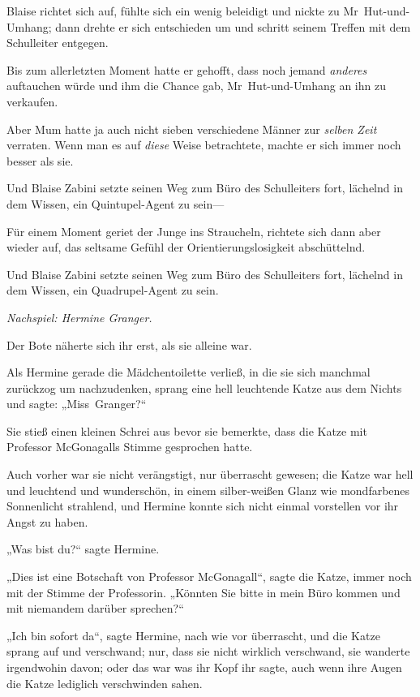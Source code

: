 {Blaise richtet sich auf, fühlte sich ein wenig beleidigt und nickte zu Mr~Hut-und-Umhang; dann drehte er sich entschieden um und schritt seinem Treffen mit dem Schulleiter entgegen.

Bis zum allerletzten Moment hatte er gehofft, dass noch jemand \emph{anderes} auftauchen würde und ihm die Chance gab, Mr~Hut-und-Umhang an ihn zu verkaufen.

Aber Mum hatte ja auch nicht sieben verschiedene Männer zur \emph{selben Zeit} verraten. Wenn man es auf \emph{diese} Weise betrachtete, machte er sich immer noch besser als sie.

Und Blaise Zabini setzte seinen Weg zum Büro des Schulleiters fort, lächelnd in dem Wissen, ein Quintupel-Agent zu sein—

Für einem Moment geriet der Junge ins Straucheln, richtete sich dann aber wieder auf, das seltsame Gefühl der Orientierungslosigkeit abschüttelnd.

Und Blaise Zabini setzte seinen Weg zum Büro des Schulleiters fort, lächelnd in dem Wissen, ein Quadrupel-Agent zu sein.

\emph{Nachspiel: Hermine Granger.}

Der Bote näherte sich ihr erst, als sie alleine war.

Als Hermine gerade die Mädchentoilette verließ, in die sie sich manchmal zurückzog um nachzudenken, sprang eine hell leuchtende Katze aus dem Nichts und sagte: „Miss~Granger?“

Sie stieß einen kleinen Schrei aus bevor sie bemerkte, dass die Katze mit Professor McGonagalls Stimme gesprochen hatte.

Auch vorher war sie nicht verängstigt, nur überrascht gewesen; die Katze war hell und leuchtend und wunderschön, in einem silber-weißen Glanz wie mondfarbenes Sonnenlicht strahlend, und Hermine konnte sich nicht einmal vorstellen vor ihr Angst zu haben.

„Was bist du?“ sagte Hermine.

„Dies ist eine Botschaft von Professor McGonagall“, sagte die Katze, immer noch mit der Stimme der Professorin. „Könnten Sie bitte in mein Büro kommen und mit niemandem darüber sprechen?“

„Ich bin sofort da“, sagte Hermine, nach wie vor überrascht, und die Katze sprang auf und verschwand; nur, dass sie nicht wirklich verschwand, sie wanderte irgendwohin davon; oder das war was ihr Kopf ihr sagte, auch wenn ihre Augen die Katze lediglich verschwinden sahen.

}
